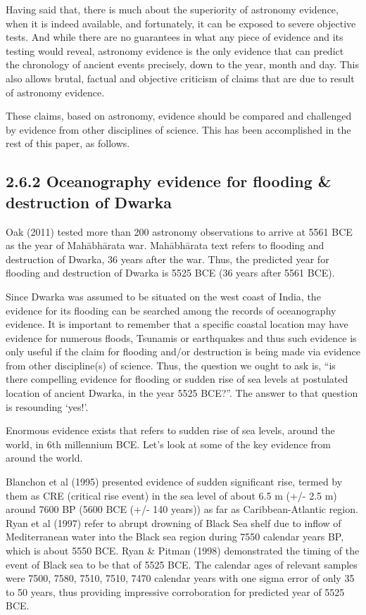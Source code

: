 Having said that, there is much about the superiority of astronomy evidence, when it is indeed available, and fortunately, it can be exposed to severe objective tests. And while there are no guarantees in what any piece of evidence and its testing would reveal, astronomy evidence is the only evidence that can predict the chronology of ancient events precisely, down to the year, month and day. This also allows brutal, factual and objective criticism of claims that are due to result of astronomy evidence.

These claims, based on astronomy, evidence should be compared and challenged by evidence from other disciplines of science. This has been accomplished in the rest of this paper, as follows.


\subsection*{2.6.2 Oceanography evidence for flooding \& destruction of Dwarka}

Oak (2011) tested more than 200 astronomy observations to arrive at 5561 BCE as the year of Mahābhārata war. Mahābhārata text refers to flooding and destruction of Dwarka, 36 years after the war. Thus, the predicted year for flooding and destruction of Dwarka is 5525 BCE (36 years after 5561 BCE).

\newpage

Since Dwarka was assumed to be situated on the west coast of India, the evidence for its flooding can be searched among the records of oceanography evidence. It is important to remember that a specific coastal location may have evidence for numerous floods, Tsunamis or earthquakes and thus such evidence is only useful if the claim for flooding and/or destruction is being made via evidence from other discipline(s) of science. Thus, the question we ought to ask is, “is there compelling evidence for flooding or sudden rise of sea levels at postulated location of ancient Dwarka, in the year 5525 BCE?”. The answer to that question is resounding ‘yes!’.

Enormous evidence exists that refers to sudden rise of sea levels, around the world, in 6th millennium BCE. Let’s look at some of the key evidence from around the world.

Blanchon et al (1995) presented evidence of sudden significant rise, termed by them as CRE (critical rise event) in the sea level of about 6.5 m (+/- 2.5 m) around 7600 BP (5600 BCE (+/- 140 years)) as far as Caribbean-Atlantic region. Ryan et al (1997) refer to abrupt drowning of Black Sea shelf due to inflow of Mediterranean water into the Black sea region during 7550 calendar years BP, which is about 5550 BCE. Ryan \& Pitman (1998) demonstrated the timing of the event of Black sea to be that of 5525 BCE. The calendar ages of relevant samples were 7500, 7580, 7510, 7510, 7470 calendar years with one sigma error of only 35 to 50 years, thus providing impressive corroboration for predicted year of 5525 BCE.

